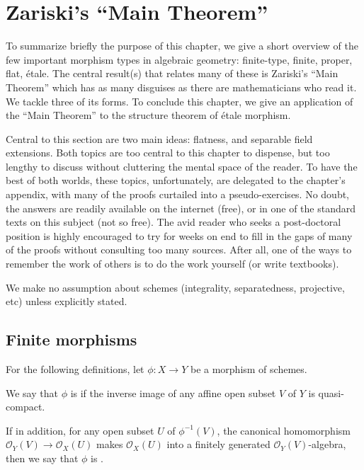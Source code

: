 \chapter{Zariski's ``Main Theorem''}
\label{sect_zariski}

\renewcommand{\O}{\mathcal{O}}

To summarize briefly the purpose of this chapter, we give a short 
overview of the few important morphism types in algebraic 
geometry: finite-type, finite, proper, flat, \'etale. The central 
result(s) that relates many of these is Zariski's ``Main Theorem'' 
which has as many disguises as there are mathematicians who read 
it. We tackle three of its forms. To conclude this chapter, we 
give an application of the ``Main Theorem'' to the structure 
theorem of \'etale morphism.

Central to this section are two main ideas: flatness, and 
separable field extensions. Both topics are too central to this
chapter to dispense, but too lengthy to discuss without cluttering
the mental space of the reader. To have the best of both worlds, 
these topics, unfortunately, are delegated to the chapter's 
appendix, with many of the proofs curtailed into a 
pseudo-exercises. No doubt, the answers are readily available on 
the internet (free), or in one of the standard texts on this 
subject (not so free). The avid reader who seeks a post-doctoral 
position is highly encouraged to try for weeks on end to fill in 
the gaps of many of the proofs without consulting too many 
sources. After all, one of the ways to remember the work of others 
is to do the work yourself (or write textbooks).

We make no assumption about schemes (integrality, separatedness, 
projective, etc) unless explicitly stated. 

\section{Finite morphisms}

For the following definitions, let $\phi: X \to Y$ be a morphism of 
schemes.

\begin{defn}
We say that $\phi$ is 
if the inverse image of any affine open subset $V$ of $Y$ is
quasi-compact. 

If in addition, for any open subset $U$ of $\phi^{-1}(V)$, the 
canonical homomorphism $\O_Y(V) \to \O_X(U)$ makes $\O_X(U)$ into 
a finitely generated $\O_Y(V)$-algebra, then we say that $\phi$ is 
.
\end{defn}

